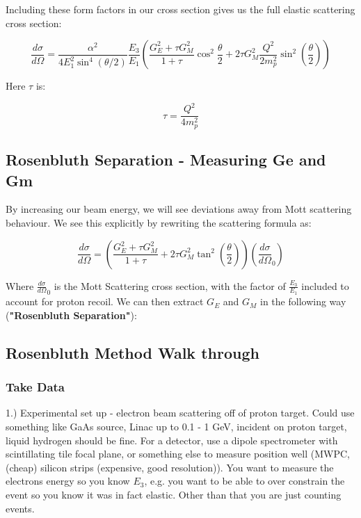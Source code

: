         Including these form factors in our cross section gives us the full elastic scattering cross section:
                
        \begin{equation}
            \frac{d\sigma}{d\Omega} = \frac{\alpha^2}{4E_1^2\sin^4{(\theta/2)}}\frac{E_3}{E_1}\left( \frac{G_E^2+\tau G_M^2}{1+\tau} \cos^2{\frac{\theta}{2}}+2\tau G_M^2\frac{Q^2}{2m_p^2}\sin^2(\frac{\theta}{2})\right)
        \end{equation}
        
        Here $\tau$ is:
                
        \begin{equation}
            \tau = \frac{Q^2}{4m_p^2}
        \end{equation}
        
        
        \subsection{Rosenbluth Separation - Measuring Ge and Gm}
            \indent By increasing our beam energy, we will see deviations away from Mott scattering behaviour. We see this explicitly by rewriting the scattering formula as:
            
            \begin{equation}
                \frac{d\sigma}{d\Omega} = \left( \frac{G_E^2+\tau G_M^2}{1+\tau} +2\tau G_M^2\tan^2(\frac{\theta}{2})\right) \left( \frac{d\sigma}{d\Omega}_0\right)
            \end{equation}
        
        
        Where $\frac{d\sigma}{d\Omega}_0$ is the Mott Scattering cross section, with the factor of $\frac{E_3}{E_1}$ included to account for proton recoil. We can then extract $G_E$ and $G_M$ in the following way (\textbf{"Rosenbluth Separation"}):\\
        \subsection{Rosenbluth Method Walk through}
            \subsubsection{Take Data}
                1.) Experimental set up - electron beam scattering off of proton target. Could use something like GaAs source, Linac up to 0.1 - 1 GeV, incident on proton target, liquid hydrogen should be fine. For a detector, use a dipole spectrometer with scintillating tile focal plane, or something else to measure position well (MWPC, (cheap) silicon strips (expensive, good resolution)). You want to measure the electrons energy so you know $E_3$, e.g. you want to be able to over constrain the event so you know it was in fact elastic. Other than that you are just counting events.\\
                

